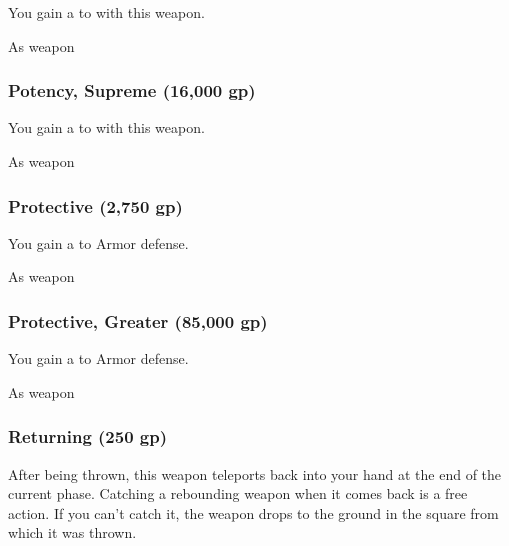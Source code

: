 You gain a   to  with this weapon.



 As weapon


\lowercase{\hypertarget{item:Potency, Supreme}{}}\label{item:Potency, Supreme}
\hypertarget{item:Potency, Supreme}{\subsubsection{Potency, Supreme\hfill{} (16,000 gp)}}

You gain a   to  with this weapon.



 As weapon


\lowercase{\hypertarget{item:Protective}{}}\label{item:Protective}
\hypertarget{item:Protective}{\subsubsection{Protective\hfill{} (2,750 gp)}}

You gain a   to Armor defense.



 


 As weapon


\lowercase{\hypertarget{item:Protective, Greater}{}}\label{item:Protective, Greater}
\hypertarget{item:Protective, Greater}{\subsubsection{Protective, Greater\hfill{} (85,000 gp)}}

You gain a   to Armor defense.



 


 As weapon


\lowercase{\hypertarget{item:Returning}{}}\label{item:Returning}
\hypertarget{item:Returning}{\subsubsection{Returning\hfill{} (250 gp)}}

After being thrown, this weapon teleports back into your hand at the end of the current phase.
Catching a rebounding weapon when it comes back is a free action.
If you can't catch it, the weapon drops to the ground in the square from which it was thrown.



